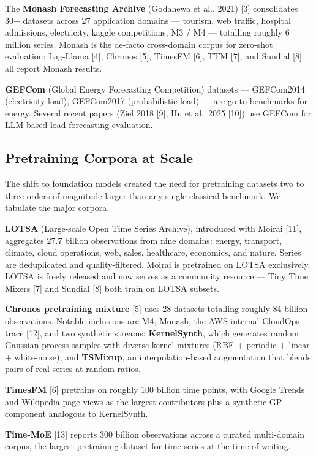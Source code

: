 \documentclass{article}
\begin{document}
The \textbf{Monash Forecasting Archive} (Godahewa et al., 2021) {[}3{]} consolidates 30+ datasets across 27 application domains --- tourism, web traffic, hospital admissions, electricity, kaggle competitions, M3 / M4 --- totalling roughly 6 million series. Monash is the de-facto cross-domain corpus for zero-shot evaluation: Lag-Llama {[}4{]}, Chronos {[}5{]}, TimesFM {[}6{]}, TTM {[}7{]}, and Sundial {[}8{]} all report Monash results.

\textbf{GEFCom} (Global Energy Forecasting Competition) datasets --- GEFCom2014 (electricity load), GEFCom2017 (probabilistic load) --- are go-to benchmarks for energy. Several recent papers (Ziel 2018 {[}9{]}, Hu et al.~2025 {[}10{]}) use GEFCom for LLM-based load forecasting evaluation.

\subsection{Pretraining Corpora at Scale}\label{pretraining-corpora-at-scale}

The shift to foundation models created the need for pretraining datasets two to three orders of magnitude larger than any single classical benchmark. We tabulate the major corpora.

\textbf{LOTSA} (Large-scale Open Time Series Archive), introduced with Moirai {[}11{]}, aggregates 27.7 billion observations from nine domains: energy, transport, climate, cloud operations, web, sales, healthcare, economics, and nature. Series are deduplicated and quality-filtered. Moirai is pretrained on LOTSA exclusively. LOTSA is freely released and now serves as a community resource --- Tiny Time Mixers {[}7{]} and Sundial {[}8{]} both train on LOTSA subsets.

\textbf{Chronos pretraining mixture} {[}5{]} uses 28 datasets totalling roughly 84 billion observations. Notable inclusions are M4, Monash, the AWS-internal CloudOps trace {[}12{]}, and two synthetic streams: \textbf{KernelSynth}, which generates random Gaussian-process samples with diverse kernel mixtures (RBF + periodic + linear + white-noise), and \textbf{TSMixup}, an interpolation-based augmentation that blends pairs of real series at random ratios.

\textbf{TimesFM} {[}6{]} pretrains on roughly 100 billion time points, with Google Trends and Wikipedia page views as the largest contributors plus a synthetic GP component analogous to KernelSynth.

\textbf{Time-MoE} {[}13{]} reports 300 billion observations across a curated multi-domain corpus, the largest pretraining dataset for time series at the time of writing.
\end{document}
